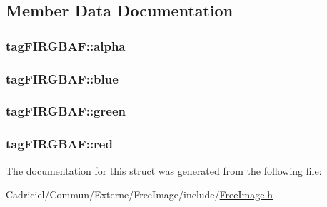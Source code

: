 \subsection{Member Data Documentation}
\hypertarget{structtag_f_i_r_g_b_a_f_a59da6fdc089e6ad1f8b2be601815f5cb}{
\subsubsection[{alpha}]{ tag\-F\-I\-R\-G\-B\-A\-F\-::alpha}}\label{structtag_f_i_r_g_b_a_f_a59da6fdc089e6ad1f8b2be601815f5cb}
\hypertarget{structtag_f_i_r_g_b_a_f_a9c2e5ec45c4c33518fd4765f5fd04b01}{
\subsubsection[{blue}]{ tag\-F\-I\-R\-G\-B\-A\-F\-::blue}}\label{structtag_f_i_r_g_b_a_f_a9c2e5ec45c4c33518fd4765f5fd04b01}
\hypertarget{structtag_f_i_r_g_b_a_f_ac4e284e0711fdba31b624cee92d85e2b}{
\subsubsection[{green}]{ tag\-F\-I\-R\-G\-B\-A\-F\-::green}}\label{structtag_f_i_r_g_b_a_f_ac4e284e0711fdba31b624cee92d85e2b}
\hypertarget{structtag_f_i_r_g_b_a_f_a59e5260e2f6e013661bc5d4775b18d9e}{
\subsubsection[{red}]{ tag\-F\-I\-R\-G\-B\-A\-F\-::red}}\label{structtag_f_i_r_g_b_a_f_a59e5260e2f6e013661bc5d4775b18d9e}


The documentation for this struct was generated from the following file\-:\begin{DoxyCompactItemize}
\item 
Cadriciel/\-Commun/\-Externe/\-Free\-Image/include/\hyperlink{_free_image_8h}{Free\-Image.\-h}\end{DoxyCompactItemize}
